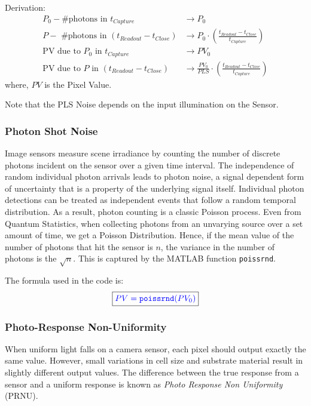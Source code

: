 Derivation:
\begin{equation*}
    \begin{aligned}
        P_0 - \text{\# photons in } t_{Capture} & \rightarrow P_0 \\
        P - \text{ \# photons in } (t_{Readout} - t_{Close}) & \rightarrow P_0 \cdot \left(\frac{t_{Readout} - t_{Close}}{t_{Capture}}\right) \\
        \text{PV due to } P_0 \text{ in } t_{Capture} & \rightarrow PV_0 \\
        \text{PV due to } P \text{ in } (t_{Readout} - t_{Close}) & \rightarrow \frac{PV_0}{PLS} \cdot \left(\frac{t_{Readout} - t_{Close}}{t_{Capture}}\right)
    \end{aligned}
\end{equation*}
where, $PV$ is the Pixel Value. 

Note that the PLS Noise depends on the input illumination on the Sensor.


\subsubsection{Photon Shot Noise} %
Image sensors measure scene irradiance by counting the number of discrete photons incident on the sensor over a given time interval. The independence of random individual photon arrivals leads to photon noise, a signal dependent form of uncertainty that is a property of the underlying signal itself. Individual photon detections can be treated as independent events that follow a random temporal distribution. As a result, photon counting is a classic Poisson process. Even from Quantum Statistics, when collecting photons from an unvarying source over a set amount of time, we get a Poisson Distribution. Hence, if the mean value of the number of photons that hit the sensor is $n$, the variance in the number of photons is the $\sqrt{n}$. This is captured by the MATLAB function \texttt{poissrnd}.

The formula used in the code is:
\begin{equation}
    \boxed{ \color{blue} PV = \texttt{poissrnd}(PV_0) \color{black}}
\end{equation}


\subsubsection{Photo-Response Non-Uniformity} %
When uniform light falls on a camera sensor, each pixel should output exactly the same value. However, small variations in cell size and substrate material result in slightly different output values. The difference between the true response from a sensor and a uniform response is known as \emph{Photo Response Non Uniformity} (PRNU).

